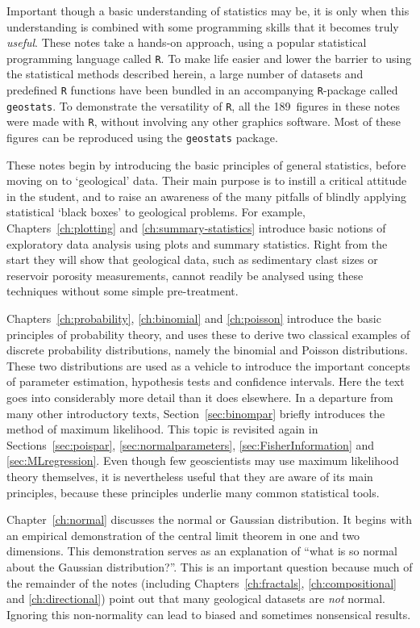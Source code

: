 Important though a basic understanding of statistics may be, it is
only when this understanding is combined with some programming skills
that it becomes truly \emph{useful}. These notes take a hands-on
approach, using a popular statistical programming language called
\texttt{R}.  To make life easier and lower the barrier to using the
statistical methods described herein, a large number of datasets and
predefined \texttt{R} functions have been bundled in an accompanying
\texttt{R}-package called \texttt{geostats}.  To demonstrate the
versatility of \texttt{R}, all the 189~figures in these notes were
made with \texttt{R}, without involving any other graphics
software. Most of these figures can be reproduced using the
\texttt{geostats} package.\medskip

These notes begin by introducing the basic principles of general
statistics, before moving on to `geological' data. Their main purpose
is to instill a critical attitude in the student, and to raise an
awareness of the many pitfalls of blindly applying statistical `black
boxes' to geological problems. For example, Chapters~\ref{ch:plotting}
and \ref{ch:summary-statistics} introduce basic notions of exploratory
data analysis using plots and summary statistics. Right from the start
they will show that geological data, such as sedimentary clast sizes
or reservoir porosity measurements, cannot readily be analysed using
these techniques without some simple pre-treatment.\medskip

Chapters~\ref{ch:probability}, \ref{ch:binomial} and \ref{ch:poisson}
introduce the basic principles of probability theory, and uses these
to derive two classical examples of discrete probability
distributions, namely the binomial and Poisson distributions. These
two distributions are used as a vehicle to introduce the important
concepts of parameter estimation, hypothesis tests and confidence
intervals. Here the text goes into considerably more detail than it
does elsewhere. In a departure from many other introductory texts,
Section~\ref{sec:binompar} briefly introduces the method of maximum
likelihood. This topic is revisited again in
Sections~\ref{sec:poispar}, \ref{sec:normalparameters},
\ref{sec:FisherInformation} and \ref{sec:MLregression}. Even though
few geoscientists may use maximum likelihood theory themselves, it is
nevertheless useful that they are aware of its main principles,
because these principles underlie many common statistical tools.\medskip

Chapter~\ref{ch:normal} discusses the normal or Gaussian
distribution. It begins with an empirical demonstration of the central
limit theorem in one and two dimensions. This demonstration serves as
an explanation of ``what is so normal about the Gaussian
distribution?''.  This is an important question because much of the
remainder of the notes (including Chapters~\ref{ch:fractals},
\ref{ch:compositional} and \ref{ch:directional}) point out that many
geological datasets are \emph{not} normal. Ignoring this non-normality
can lead to biased and sometimes nonsensical results.\medskip

